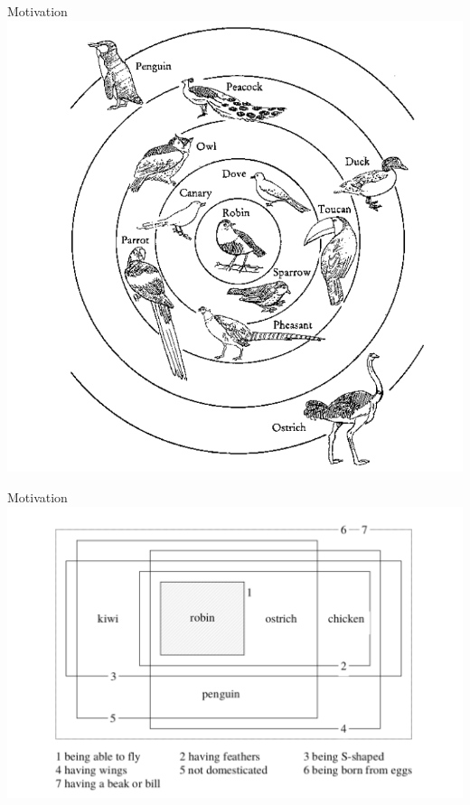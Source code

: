 \documentclass[10pt, xcolor=dvipsnames]{beamer}
\begin{document}
\begin{frame}[fragile]{Motivation}
\includegraphics[scale=.33]{img/birdstyp.png}
\end{frame}

\begin{frame}[fragile]{Motivation}
  \includegraphics[scale=.33]{img/familyres.png}
\end{frame}


%
%
\end{document}

